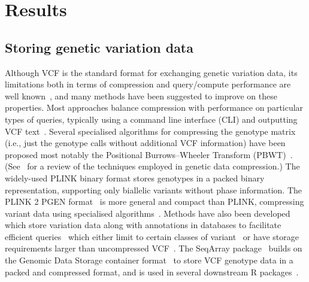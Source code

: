 \documentclass[a4paper,num-refs]{oup-contemporary}
\begin{document}
\section{Results}

\subsection{Storing genetic variation data}
Although VCF is the standard format for exchanging genetic variation
data, its limitations both in terms of compression
and query/compute performance are well
known~\citep[e.g.][]{kelleher2013processing,layer2016efficient,li2016bgt},
and many methods
have been suggested to improve on these properties.
Most approaches balance compression with
performance on particular types of queries,
typically using a command line interface (CLI)
and outputting VCF text~\citep{
layer2016efficient, %
li2016bgt, %
tatwawadi2016gtrac, %
danek2018gtc, %
lin2020sparse, %
lan2020genozip,lan2021genozip, %
lefaive2021sparse, %
wertenbroek2022xsi,%
zhang2023gbc,%
luo2024gsc}. %
Several specialised algorithms for compressing
the genotype matrix (i.e., just the genotype calls without additional
VCF information) have been proposed
\citep{qiao2012handling, %
deorowicz2013genome, %
sambo2014compression, %
deorowicz2019gtshark, %
deorowicz2021vcfshark, %
dehaas2024genotype} %
most notably the Positional
Burrows--Wheeler Transform (PBWT)~\citep{durbin2014efficient}.
(See~\citep{mcvean2019linkage} for a review of the techniques
employed in genetic data compression.)
The widely-used PLINK binary format stores genotypes in a
packed binary representation, supporting only biallelic
variants without phase information.
The PLINK 2 PGEN format~\citep{rivas2024efficient} is more general
and compact than PLINK, compressing variant data using specialised
algorithms~\cite{sambo2014compression}.
Methods have also been developed which store variation data
along with annotations in databases to facilitate
efficient queries~\cite[e.g.][]{
paila2013gemini,%
lopez2017hgva} %
which either limit to certain classes of variant~\cite[e.g.][]{greene2023genetic}
or have storage requirements larger
than uncompressed VCF~\citep{al2023critical}.
The SeqArray package~\citep{zheng2017seqarray} builds on the
Genomic Data Storage container format~\cite{zheng2012high}
to store VCF genotype data in a packed and compressed format,
and is used in several downstream R packages~\cite[e.g.][]{
gogarten2019genetic,fernandes2020simplephenotypes}.
\end{document}
